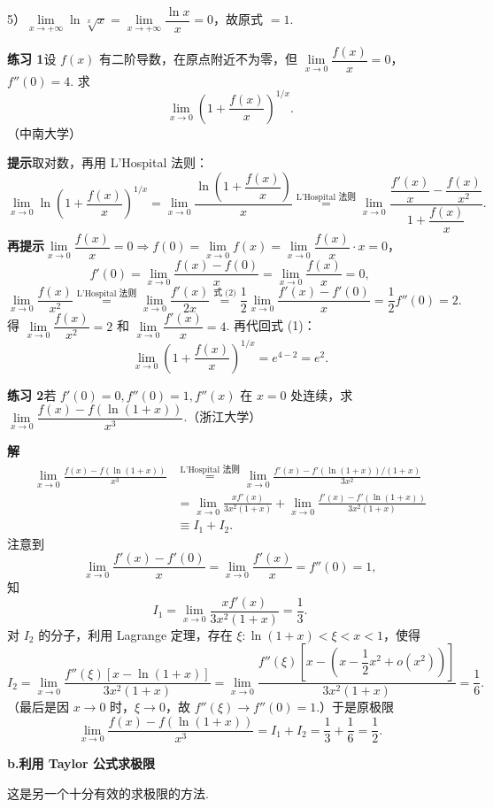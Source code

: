 \documentclass[UTF8,12pt,a4paper,fontset=fandol]{ctexart}
\begin{document}
5）$\lim\limits_{x\to+\infty}\ln\sqrt[x]{x}
=\lim\limits_{x\to+\infty}\dfrac{\ln x}{x}=0$，故原式 $=1$.

\noindent\textbf{练习 1}\quad 设 $f(x)$ 有二阶导数，在原点附近不为零，但 $\lim\limits_{x\to0}\dfrac{f(x)}x=0$，$f''(0)=4$. 求
\[
  \lim_{x\to0}\left(1+\frac{f(x)}x\right)^{1/x}.
\]
（中南大学）

\noindent\textbf{提示}\quad 取对数，再用 L'Hospital 法则：
\[
\lim_{x\to0}\ln\left(1+\frac{f(x)}x\right)^{1/x}
=\lim_{x\to0}\frac{\ln\left(1+\dfrac{f(x)}x\right)}x
\stackrel{\text{L'Hospital 法则}}{=}
\lim_{x\to0}\frac{\dfrac{f'(x)}x-\dfrac{f(x)}{x^2}}{1+\dfrac{f(x)}x}.
\tag{1}
\]
\noindent\textbf{再提示}\quad $\lim\limits_{x\to0}\dfrac{f(x)}x=0\Rightarrow f(0)=\lim\limits_{x\to0}f(x)=\lim\limits_{x\to0}\dfrac{f(x)}x\cdot x=0$，
\[
f'(0)=\lim_{x\to0}\frac{f(x)-f(0)}x=\lim_{x\to0}\frac{f(x)}x=0,
\tag{2}
\]
\[
\lim_{x\to0}\frac{f(x)}{x^2}
\stackrel{\text{L'Hospital 法则}}{=}\lim_{x\to0}\frac{f'(x)}{2x}
\stackrel{\text{式 (2)}}{=}\frac12\lim_{x\to0}\frac{f'(x)-f'(0)}x
=\frac12f''(0)=2.
\]
得 $\lim\limits_{x\to0}\dfrac{f(x)}{x^2}=2$ 和 $\lim\limits_{x\to0}\dfrac{f'(x)}x=4$. 再代回式 (1)：
\[
  \lim_{x\to0}\left(1+\frac{f(x)}x\right)^{1/x}=e^{4-2}=e^2.
\]

\noindent\textbf{练习 2}\quad 若 $f'(0)=0,f''(0)=1,f''(x)$ 在 $x=0$ 处连续，求 $\lim\limits_{x\to0}\dfrac{f(x)-f(\ln(1+x))}{x^3}$.（浙江大学）

\noindent\textbf{解}\quad
\[
\begin{aligned}
\lim_{x\to0}\frac{f(x)-f(\ln(1+x))}{x^3}
&\stackrel{\text{L'Hospital 法则}}{=}
\lim_{x\to0}\frac{f'(x)-f'(\ln(1+x))/(1+x)}{3x^2}\\
&=\lim_{x\to0}\frac{xf'(x)}{3x^2(1+x)}
+\lim_{x\to0}\frac{f'(x)-f'(\ln(1+x))}{3x^2(1+x)}\\
&\equiv I_1+I_2.
\end{aligned}
\]
注意到
\[
  \lim_{x\to0}\frac{f'(x)-f'(0)}x
  =\lim_{x\to0}\frac{f'(x)}x=f''(0)=1,
\]
知
\[
  I_1=\lim_{x\to0}\frac{xf'(x)}{3x^2(1+x)}=\frac13.
\]
对 $I_2$ 的分子，利用 Lagrange 定理，存在 $\xi:\ln(1+x)<\xi<x<1$，使得
\[
I_2=\lim_{x\to0}
\frac{f''(\xi)[x-\ln(1+x)]}{3x^2(1+x)}
=\lim_{x\to0}
\frac{f''(\xi)\left[x-\left(x-\dfrac12x^2+o(x^2)\right)\right]}{3x^2(1+x)}
=\frac16.
\]
（最后是因 $x\to0$ 时，$\xi\to0$，故 $f''(\xi)\to f''(0)=1$.）于是原极限
\[
  \lim_{x\to0}\frac{f(x)-f(\ln(1+x))}{x^3}
  =I_1+I_2=\frac13+\frac16=\frac12.
\]

\noindent\textbf{b.\quad 利用 Taylor 公式求极限}

这是另一个十分有效的求极限的方法.
\end{document}
